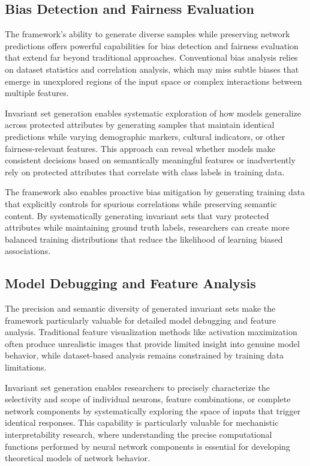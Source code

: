 \subsection{Bias Detection and Fairness Evaluation}

The framework's ability to generate diverse samples while preserving network predictions offers powerful capabilities for bias detection and fairness evaluation that extend far beyond traditional approaches. Conventional bias analysis relies on dataset statistics and correlation analysis, which may miss subtle biases that emerge in unexplored regions of the input space or complex interactions between multiple features.

Invariant set generation enables systematic exploration of how models generalize across protected attributes by generating samples that maintain identical predictions while varying demographic markers, cultural indicators, or other fairness-relevant features. This approach can reveal whether models make consistent decisions based on semantically meaningful features or inadvertently rely on protected attributes that correlate with class labels in training data.

The framework also enables proactive bias mitigation by generating training data that explicitly controls for spurious correlations while preserving semantic content. By systematically generating invariant sets that vary protected attributes while maintaining ground truth labels, researchers can create more balanced training distributions that reduce the likelihood of learning biased associations.

\subsection{Model Debugging and Feature Analysis}

The precision and semantic diversity of generated invariant sets make the framework particularly valuable for detailed model debugging and feature analysis. Traditional feature visualization methods like activation maximization often produce unrealistic images that provide limited insight into genuine model behavior, while dataset-based analysis remains constrained by training data limitations.

Invariant set generation enables researchers to precisely characterize the selectivity and scope of individual neurons, feature combinations, or complete network components by systematically exploring the space of inputs that trigger identical responses. This capability is particularly valuable for mechanistic interpretability research, where understanding the precise computational functions performed by neural network components is essential for developing theoretical models of network behavior.

